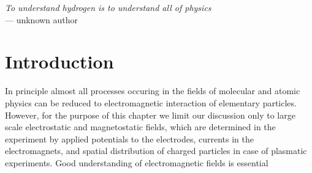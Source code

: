 \begin{flushright}
\textsl{To understand hydrogen is to understand all of physics }\\
 \medskip{}
 --- unknown author 
\par\end{flushright}

\bigskip{}
\begingroup
\let\clearpage\relax
\let\cleardoublepage\relax


\chapter{Introduction}

\label{ch:Introduction}In principle almost all processes occuring
in the fields of molecular and atomic physics can be reduced to electromagnetic
interaction of elementary particles. However, for the purpose of this
chapter we limit our discussion only to large scale electrostatic
and magnetostatic fields, which are determined in the experiment by
applied potentials to the electrodes, currents in the electromagnets,
and spatial distribution of charged particles in case of plasmatic
experiments. Good understanding of electromagnetic fields is essential 

\endgroup
